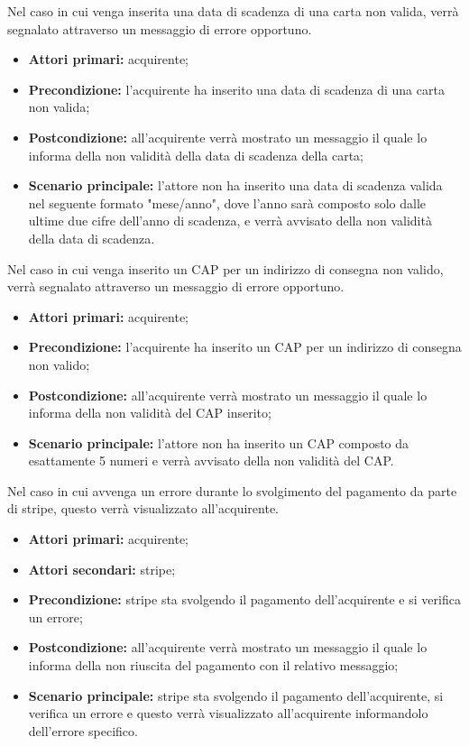 Nel caso in cui venga inserita una data di scadenza di una carta non valida, verrà segnalato attraverso un messaggio di errore opportuno.
\begin{itemize}
	\item \textbf{Attori primari:} acquirente;
	\item \textbf{Precondizione:} l'acquirente ha inserito una data di scadenza di una carta non valida;
	\item \textbf{Postcondizione:} all'acquirente verrà mostrato un messaggio il quale lo informa della non validità della data di scadenza della carta;
	\item \textbf{Scenario principale:} l'attore non ha inserito una data di scadenza valida nel seguente formato "mese/anno", dove l'anno sarà composto solo dalle ultime due cifre dell'anno di scadenza, e verrà avvisato della non validità della data di scadenza.
\end{itemize}

Nel caso in cui venga inserito un CAP per un indirizzo di consegna non valido, verrà segnalato attraverso un messaggio di errore opportuno.
\begin{itemize}
	\item \textbf{Attori primari:} acquirente;
	\item \textbf{Precondizione:} l'acquirente ha inserito un CAP per un indirizzo di consegna non valido;
	\item \textbf{Postcondizione:} all'acquirente verrà mostrato un messaggio il quale lo informa della non validità del CAP inserito;
	\item \textbf{Scenario principale:} l'attore non ha inserito un CAP composto da esattamente 5 numeri e verrà avvisato della non validità del CAP.
\end{itemize}

Nel caso in cui avvenga un errore durante lo svolgimento del pagamento da parte di stripe, questo verrà visualizzato all'acquirente.
\begin{itemize}
	\item \textbf{Attori primari:} acquirente;
	\item \textbf{Attori secondari:} stripe;
	\item \textbf{Precondizione:} stripe sta svolgendo il pagamento dell'acquirente e si verifica un errore;
	\item \textbf{Postcondizione:} all'acquirente verrà mostrato un messaggio il quale lo informa della non riuscita del pagamento con il relativo messaggio;
	\item \textbf{Scenario principale:} stripe sta svolgendo il pagamento dell'acquirente, si verifica un errore e questo verrà visualizzato all'acquirente informandolo dell'errore specifico.
\end{itemize}

